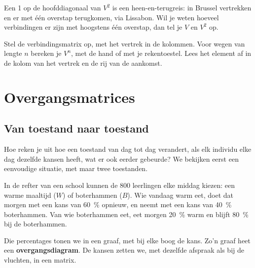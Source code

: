 Een 1 op de hoofddiagonaal van $V^2$ is een heen-en-terugreis: in Brussel vertrekken en er met één overstap terugkomen, via Lissabon. Wil je weten hoeveel verbindingen er zijn met hoogstens één overstap, dan tel je $V$ en $V^2$ op.

\begin{werkwijze}
Stel de verbindingsmatrix op, met het vertrek in de kolommen. Voor wegen van lengte $n$ bereken je $V^n$, met de hand of met je rekentoestel. Lees het element af in de kolom van het vertrek en de rij van de aankomst.
\end{werkwijze}


\begin{oefeningen}
\end{oefeningen}

\section{Overgangsmatrices}

\subsection{Van toestand naar toestand}

Hoe reken je uit hoe een toestand van dag tot dag verandert, als elk individu elke dag dezelfde kansen heeft, wat er ook eerder gebeurde? We bekijken eerst een eenvoudige situatie, met maar twee toestanden.

In de refter van een school kunnen de 800 leerlingen elke middag kiezen: een warme maaltijd ($W$) of boterhammen ($B$). Wie vandaag warm eet, doet dat morgen met een kans van 60~\% opnieuw, en neemt met een kans van 40~\% boterhammen. Van wie boterhammen eet, eet morgen 20~\% warm en blijft 80~\% bij de boterhammen.

Die percentages tonen we in een graaf, met bij elke boog de kans. Zo'n graaf heet een \textbf{overgangsdiagram}. De kansen zetten we, met dezelfde afspraak als bij de vluchten, in een matrix.

